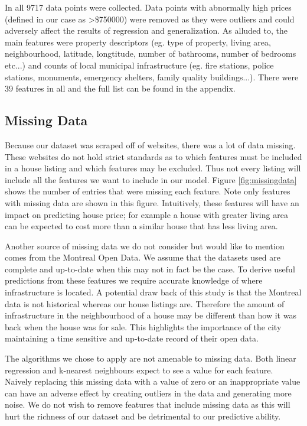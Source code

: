 \documentclass{acm_proc_article-sp}
\begin{document}
	In all 9717 data points were collected. Data points with abnormally high prices (defined in our case as >\$750000) were removed as they were outliers and could adversely affect the results of regression and generalization. As alluded to, the main features were property descriptors (eg. type of property, living area, neighbourhood, latitude, longtitude, number of bathrooms, number of bedrooms etc...) and counts of local municipal infrastructure (eg. fire stations, police stations, monuments, emergency shelters, family quality buildings...). There were 39 features in all and the full list can be found in the appendix.
	
\subsection{Missing Data} %

	Because our dataset was scraped off of websites, there was a lot of data missing. These websites do not hold strict standards as to which features must be included in a house listing and which features may be excluded. Thus not every listing will include all the features we want to include in our model. Figure \ref{fig:missingdata} shows the number of entries that were missing each feature. Note only features with missing data are shown in this figure. Intuitively, these features will have an impact on predicting house price; for example a house with greater living area can be expected to cost more than a similar house that has less living area. 
	
	Another source of missing data we do not consider but would like to mention comes from the Montreal Open Data. We assume that the datasets used are complete and up-to-date when this may not in fact be the case. To derive useful predictions from these features we require accurate knowledge of where infrastructure is located. A potential draw back of this study is that the Montreal data is not historical whereas our house listings are. Therefore the amount of infrastructure in the neighbourhood of a house may be different than how it was back when the house was for sale. This highlights the importance of the city maintaining a time sensitive and up-to-date record of their open data.
	
	The algorithms we chose to apply are not amenable to missing data. Both linear regression and k-nearest neighbours expect to see a value for each feature. Naively replacing this missing data with a value of zero or an inappropriate value can have an adverse effect by creating outliers in the data and generating more noise. We do not wish to remove features that include missing data as this will hurt the richness of our dataset and be detrimental to our predictive ability.
	
\end{document}
